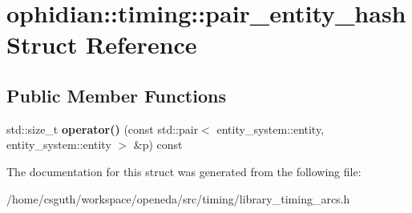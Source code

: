 \hypertarget{structophidian_1_1timing_1_1pair__entity__hash}{\section{ophidian\-:\-:timing\-:\-:pair\-\_\-entity\-\_\-hash Struct Reference}
\label{structophidian_1_1timing_1_1pair__entity__hash}
}
\subsection*{Public Member Functions}
\begin{DoxyCompactItemize}
\item 
\hypertarget{structophidian_1_1timing_1_1pair__entity__hash_a500a00641b5437c3a71c2df3946ce86b}{std\-::size\-\_\-t {\bfseries operator()} (const std\-::pair$<$ entity\-\_\-system\-::entity, entity\-\_\-system\-::entity $>$ \&p) const }\label{structophidian_1_1timing_1_1pair__entity__hash_a500a00641b5437c3a71c2df3946ce86b}

\end{DoxyCompactItemize}


The documentation for this struct was generated from the following file\-:\begin{DoxyCompactItemize}
\item 
/home/csguth/workspace/openeda/src/timing/library\-\_\-timing\-\_\-arcs.\-h\end{DoxyCompactItemize}
